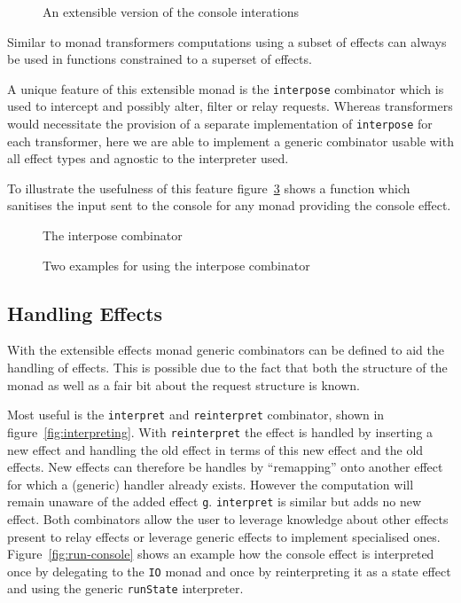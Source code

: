 \begin{figure}
  
  \caption{An extensible version of the console interations}
  \label{fig:extensible-console-effect}
\end{figure}

Similar to monad transformers computations using a subset of effects can always
be used in functions constrained to a superset of effects.

A unique feature of this extensible monad is the \texttt{interpose} combinator
which is used to intercept and possibly alter, filter or relay requests. Whereas
transformers would necessitate the provision of a separate implementation of
\texttt{interpose} for each transformer, here we are able to implement a generic
combinator usable with all effect types and agnostic to the interpreter used.

To illustrate the usefulness of this feature figure~\ref{fig:attach-timestamp}
shows a function which sanitises the input sent to the console for any monad
providing the console effect.

\begin{figure}
  
  \caption{The interpose combinator}
  \label{fig:interpose-combinator}
\end{figure}

\begin{figure}
  
  \caption{Two examples for using the interpose combinator}
  \label{fig:attach-timestamp}
\end{figure}

\subsection{Handling Effects}

With the extensible effects monad generic combinators can be defined to aid the
handling of effects. This is possible due to the fact that both the structure of
the monad as well as a fair bit about the request structure is known.

Most useful is the \texttt{interpret} and \texttt{reinterpret} combinator, shown
in figure~\ref{fig:interpreting}. With \texttt{reinterpret} the effect is
handled by inserting a new effect and handling the old effect in terms of this
new effect and the old effects. New effects can therefore be handles by
``remapping'' onto another effect for which a (generic) handler already exists.
However the computation will remain unaware of the added effect \texttt{g}.
\texttt{interpret} is similar but adds no new effect. Both combinators allow the
user to leverage knowledge about other effects present to relay effects or
leverage generic effects to implement specialised ones.
Figure~\ref{fig:run-console} shows an example how the console effect is
interpreted once by delegating to the \texttt{IO} monad and once by
reinterpreting it as a state effect and using the generic \texttt{runState}
interpreter.


